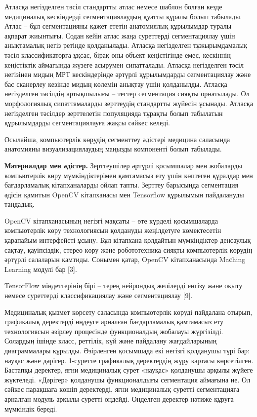 Атласқа негізделген тәсіл стандартты атлас немесе шаблон болған кезде
медициналық кескіндерді сегментациялаудың қуатты құралы болып табылады.
Атлас -- бұл сегментацияны қажет ететін анатомиялық құрылымдар туралы
ақпарат жиынтығы. Содан кейін атлас жаңа суреттерді сегментациялау үшін
анықтамалық негіз ретінде қолданылады. Атласқа негізделген
тұжырымдамалық тәсіл классификаторға ұқсас, бірақ оны объект
кеңістігінде емес, кескіннің кеңістіктік аймағында жүзеге асырумен
сипатталады. Атласқа негізделген тәсіл негізінен мидың МРТ кескіндерінде
әртүрлі құрылымдарды сегментациялау және бас сканерлеу кезінде мидың
көлемін анықтау үшін қолданылды. Атласқа негізделген тәсілдің
артықшылығы -- тегтер сегментация сияқты орнатылады. Ол морфологиялық
сипаттамаларды зерттеудің стандартты жүйесін ұсынады. Атласқа
негізделген тәсілдер зерттелетін популяцияда тұрақты болып табылатын
құрылымдарды сегментациялауға жақсы сәйкес келеді.

Осылайша, компьютерлік көрудің сегменттеу әдістері медицина саласында
анатомияны визуализациялаудың маңызды компоненті болып табылады.

{\bfseries Материалдар мен әдістер.} Зерттеушілер әртүрлі қосымшалар мен
жобаларды компьютерлік көру мүмкіндіктерімен қамтамасыз ету үшін
көптеген құралдар мен бағдарламалық кітапханаларды ойлап тапты. Зерттеу
барысында сегментация әдісін қамитын OpenCV кітапханасы мен Tensorflow
құрылымын пайдалануды таңдадық.

OpenCV кітапханасының негізгі мақсаты -- өте күрделі қосымшаларда
компьютерлік көру технологиясын қолдануды жеңілдетуге көмектесетін
қарапайым интерфейсті ұсыну. Бұл кітапхана қолдайтын мүмкіндіктер
денсаулық сақтау, қауіпсіздік, стерео көру және робототехника сияқты
компьютерлік көрудің әртүрлі салаларын қамтиды. Сонымен қатар, OpenCV
кітапханасында Maсhing Learning модулі бар {[}3{]}.

TensorFlow міндеттерінің бірі -- терең нейрондық желілерді енгізу және
оқыту немесе суреттерді классификациялау және сегментациялау {[}9{]}.

Медициналық қызмет көрсету саласында компьютерлік көруді пайдалана
отырып, графикалық деректерді өңдеуге арналған бағдарламалық қамтамасыз
ету технологиясын әзірлеу процесінде функционалдың жобалауы жүргізілді.
Солардың ішінде класс, реттілік, күй және пайдалану жағдайларының
диаграммалары құрылды. Әзірленген қосымшада екі негізгі қолданушы түрі
бар: науқас және дәрігер. 1-суретте графикалық деректердің жүру картасы
көрсетілген. Бастапқы деректер, яғни медициналық сурет «науқас»
қолданушы арқылы жүйеге жүктеледі. «Дәрігер» қолданушы функционалдығы
сегментация аймағына ие. Ол сәйкес парақшаға көшіп деректерді, яғни
медициналық суретті сегментацияға арналған модуль арқылы суретті
өңдейді. Өңделген деректер нәтиже құруға мүмкіндік береді.

